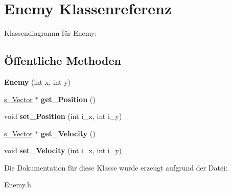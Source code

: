 \hypertarget{class_enemy}{\section{Enemy Klassenreferenz}
\label{class_enemy}
}


Klassendiagramm für Enemy\-:
\subsection*{Öffentliche Methoden}
\begin{DoxyCompactItemize}
\item 
\hypertarget{class_enemy_a98f0d2110309536798101b88d2d1d8c9}{{\bfseries Enemy} (int x, int y)}\label{class_enemy_a98f0d2110309536798101b88d2d1d8c9}

\item 
\hypertarget{class_enemy_a8894742ec191ae32c4e22014e5af8246}{\hyperlink{structs___vector}{s\-\_\-\-Vector} $\ast$ {\bfseries get\-\_\-\-Position} ()}\label{class_enemy_a8894742ec191ae32c4e22014e5af8246}

\item 
\hypertarget{class_enemy_a39b8b0f9a87bf2a7b6ee8a1f59cefcf4}{void {\bfseries set\-\_\-\-Position} (int i\-\_\-x, int i\-\_\-y)}\label{class_enemy_a39b8b0f9a87bf2a7b6ee8a1f59cefcf4}

\item 
\hypertarget{class_enemy_a01024ba4588c4ab2efc9a9e0a960c983}{\hyperlink{structs___vector}{s\-\_\-\-Vector} $\ast$ {\bfseries get\-\_\-\-Velocity} ()}\label{class_enemy_a01024ba4588c4ab2efc9a9e0a960c983}

\item 
\hypertarget{class_enemy_ab026b4302720f1676653285b27babd59}{void {\bfseries set\-\_\-\-Velocity} (int i\-\_\-x, int i\-\_\-y)}\label{class_enemy_ab026b4302720f1676653285b27babd59}

\end{DoxyCompactItemize}


Die Dokumentation für diese Klasse wurde erzeugt aufgrund der Datei\-:\begin{DoxyCompactItemize}
\item 
Enemy.\-h\end{DoxyCompactItemize}
